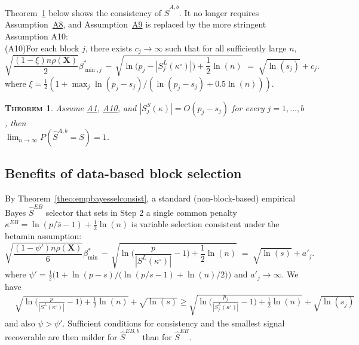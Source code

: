 \documentclass[bj,authoryear]{imsart}
\theoremstyle{plain}
\newtheorem{thm}{\textsc{Theorem}}[section]
\newcommand{\bs}{\boldsymbol}
\begin{document}
Theorem~\ref{theo:informedl0consist} below shows
the consistency of $\hat{S}^{A,b}$. It no longer requires Assumption~\hyperlink{lab:A8}{A8}, and Assumption~\hyperlink{lab:A9}{A9} is replaced by the more stringent Assumption A10: \\[5pt]
\hypertarget{lab:A10}{(A10)}\quad For each block $j$, there exists $c_j\to \infty$ such that for  all sufficiently large $n$,
\begin{equation*}
        \sqrt{\frac{ (1-\xi)n\rho(\bs X)}{2}}\beta_{\min,j}^* \,- \,\sqrt{\ln\big(p_j-|S^{L}_j(\kappa^{\circ})|\big)+\frac12\ln(n)} \;=\; \sqrt{\ln(s_j)} + c_j .
    \end{equation*}
where  $\xi=\tfrac12(1+\max_j \ln(p_j-s_j)/(\ln(p_j-s_j)+0.5\ln(n)))$.

\begin{thm}\label{theo:informedl0consist}
    Assume \hyperlink{lab:A1}{A1}, \hyperlink{lab:A10}{A10}, and $|S^{S}_j(\kappa)|=O(p_j-s_j)$ for every $j=1,\ldots,b$, then \\
$\lim_{n \to \infty} P(\hat{S}^{A,b} = S) = 1$.
\end{thm}

\subsection{Benefits of data-based block selection}

By Theorem~\ref{theo:empbayesselconsist}, a standard (non-block-based) empirical Bayes $\hat S^{EB}$ selector that sets in Step 2 a single common penalty $\kappa^{EB}=\ln(p/\hat{s} -1)+ \tfrac{1}{2}\ln(n)$ is variable selection consistent under the betamin assumption:
\begin{equation}\label{eq:betaminEB}
        \sqrt{\frac{ (1-\psi')n\rho(\bs X)}{6}}{\beta_{\min}^*} \,- \,\sqrt{\ln\bigg(\frac{p}{|S^{L}(\kappa^{\circ})|}-1\bigg)+\frac12\ln(n)} \;=\; \sqrt{\ln(s)} + a'_j .
    \end{equation}
where $\psi'=\tfrac12\Big(1+ \ln(p-s)/\big(\ln(p/s-1)+\ln(n)/2\big)\Big)$ and $a'_j \to \infty$. We have
\begin{eqnarray*}
&\sqrt{\ln\bigg(\frac{p}{|S^{L}(\kappa^{\circ})|}-1\bigg)+\frac12\ln(n)} + \sqrt{\ln(s)} \geq \sqrt{\ln\bigg(\frac{p_j}{|S^{L}_j(\kappa^{\circ})|}-1\bigg)+\frac12\ln(n)} + \sqrt{\ln(s_j)}
\end{eqnarray*}
and also $\psi > \psi'$. Sufficient conditions for consistency and the smallest signal recoverable are then milder for $\hat S^{EB,b}$ than for $\hat S^{EB}$. %
\end{document}
